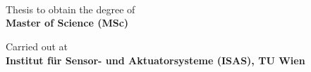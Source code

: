 \begin{titlepage}

    \noindent
    \begin{minipage}[t]{0.5\textwidth}
        \vspace{5pt}
    \end{minipage}
    \hfill
    \begin{minipage}[t]{0.5\textwidth}
        \centering
        \vspace{3mm}
    \end{minipage}

    \vspace{12mm}
    
    \centering 
    
    
    \HRule \\[0.5cm]
    { \Huge \textbf{\doctitle}}\\ 
    \HRule \\
    \vfill
    
    \small{Thesis to obtain the degree of} \\
    {\Large \textbf{Master of Science (MSc)}} \\ 
    
    \vfill
    
    
    \small{Carried out at} \\ 
    {\Large \textbf{Institut für Sensor- und Aktuatorsysteme (ISAS), TU Wien}} \\ 
    
    \vfill
        

\end{titlepage}
